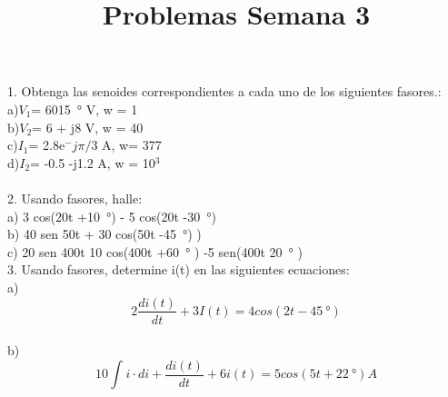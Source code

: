 \documentclass[12pt,letterpaper]{article}
\title{Problemas Semana 3}
\begin{document}



1. Obtenga las senoides correspondientes a cada uno de los siguientes fasores.:\\
a)$V_1$= 60\angle\SI{15}{\degree} V, w = 1\\
b)$V_2$= 6 + j8 V, w = 40\\
c)$I_1$= 2.8e$^-j\pi/3$ A, w= 377\\
d)$I_2$= -0.5 -j1.2 A, w = 10$^3$\\\\
2. Usando fasores, halle:\\
a) 3 cos(20t +\SI{10}{\degree}) - 5 cos(20t -\SI{30}{\degree})\\
b) 40 sen 50t + 30 cos(50t -\SI{45}{\degree}) )\\
c) 20 sen 400t 10 cos(400t +\SI{60}{\degree} ) -5 sen(400t \SI{20}{\degree} )\\
3. Usando fasores, determine i(t) en las siguientes ecuaciones:\\
a)
            \begin{equation*}
               2\dfrac{di(t)}{dt}+3I(t) = 4 cos(2t -\SI{45}{\degree})
            \end{equation*}\\
b)
\begin{equation}
    10\int_{} i \cdot di+\dfrac{di(t)}{dt} +6i(t)= 5 cos (5t +\SI{22}{\degree})A
\end{equation}\\
\end{document}
